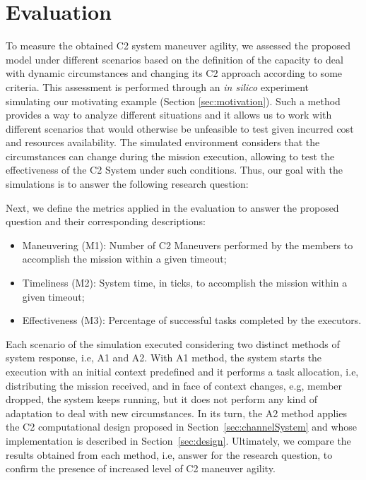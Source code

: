 \section{Evaluation}
\label{sec:evaluation}

To measure the obtained C2 system maneuver agility, we assessed the proposed model under different scenarios based on the definition of the capacity to deal with dynamic circumstances and changing its C2 approach according to some criteria. This assessment is performed through an \textit{in silico} experiment~\cite{simulation01} simulating our motivating example (Section \ref{sec:motivation}). Such a method provides a way to analyze different situations and it allows us to work with different scenarios that would otherwise be unfeasible to test given incurred cost and resources availability. The simulated environment considers that the circumstances can change during the mission execution, allowing to test the effectiveness of the C2 System under such conditions. Thus, our goal with the simulations is to answer the following research question:
 
\begin{center}
\end{center}

Next, we define the metrics applied in the evaluation to answer the proposed question and their corresponding descriptions:
\begin{itemize}
    \item Maneuvering (M1): Number of C2 Maneuvers performed by the members to accomplish the mission within a given timeout;
    \item Timeliness (M2): System time, in ticks, to accomplish the mission within a given timeout;
    \item Effectiveness (M3): Percentage of successful tasks completed by the executors.
\end{itemize}

Each scenario of the simulation executed considering two distinct methods of system response, i.e, A1 and A2. With A1 method, the system starts the execution with an initial context predefined and it performs a task allocation, i.e, distributing the mission received, and in face of context changes, e.g, member dropped, the system keeps running, but it does not perform any kind of adaptation to deal with new circumstances. In its turn, the A2 method applies the C2 computational design proposed in Section~\ref{sec:channelSystem} and whose implementation is described in Section~\ref{sec:design}. Ultimately, we compare the results obtained from each method, i.e, answer for the research question, to confirm the presence of increased level of C2 maneuver agility.

